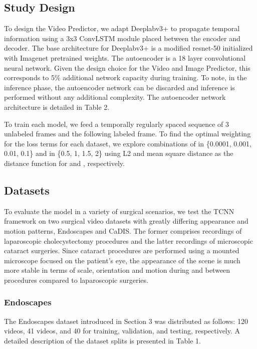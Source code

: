 \documentclass[twoside, print]{ieeecolor_arxiv}
\begin{document}
\subsection{Study Design}
To design the Video Predictor, we adapt Deeplabv3+\cite{hq1} to propagate temporal information using a 3x3 ConvLSTM \cite{clstm} module placed between the encoder and  decoder. The base architecture for Deeplabv3+ is a modified resnet-50\cite{resnet} initialized with Imagenet pretrained weights. The autoencoder is a 18 layer convolutional neural network. Given the design choice for the Video and Image Predictor, this corresponds to 5\% additional network capacity during training. To note, in the inference phase, the autoencoder network can be discarded and inference is performed without any additional complexity. The autoencoder network architecture is detailed in Table 2.

To train each model, we feed a temporally regularly spaced sequence of 3 unlabeled frames and the following labeled frame. To find the optimal weighting for the loss terms for each dataset, we explore combinations of  in \{0.0001, 0.001, 0.01, 0.1\} and  in \{0.5, 1, 1.5, 2\} using L2 and mean square distance as the distance function for  and  , respectively.




\subsection{Datasets}
To evaluate the model in a variety of surgical scenarios, we test the TCNN framework on two surgical video datasets with greatly differing appearance and motion patterns, Endoscapes and CaDIS. The former comprises recordings of laparoscopic cholecystectomy procedures and the latter recordings of microscopic cataract surgeries. Since cataract procedures are performed using a mounted microscope focused on the patient's eye, the appearance of the scene is much more stable in terms of scale, orientation and motion during and between procedures compared to laparoscopic surgeries.

\subsubsection{Endoscapes}
The Endoscapes dataset introduced in Section 3 was distributed as follows: 120 videos, 41 videos, and 40 for training, validation, and testing, respectively. A detailed description of the dataset splits is presented in Table 1.
\end{document}
